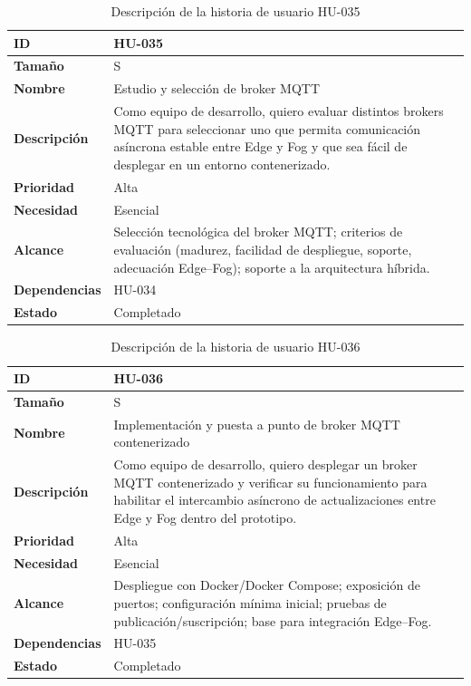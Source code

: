 \documentclass{report}
\begin{document}
\begin{table}[H]
\centering
\caption{Descripción de la historia de usuario HU-035}
\label{tab:hu035}
\begin{tabular}{|l|p{12cm}|}
\hline
\textbf{ID} & HU-035 \\ \hline
\textbf{Tamaño} & S \\ \hline
\textbf{Nombre} & Estudio y selección de broker MQTT \\ \hline
\textbf{Descripción} &
Como equipo de desarrollo, quiero evaluar distintos brokers MQTT para seleccionar uno que permita comunicación asíncrona estable entre Edge y Fog y que sea fácil de desplegar en un entorno contenerizado. \\ \hline
\textbf{Prioridad} & Alta \\ \hline
\textbf{Necesidad} & Esencial \\ \hline
\textbf{Alcance} &
Selección tecnológica del broker MQTT; criterios de evaluación (madurez, facilidad de despliegue, soporte, adecuación Edge--Fog); soporte a la arquitectura híbrida. \\ \hline
\textbf{Dependencias} & HU-034 \\ \hline
\textbf{Estado} & Completado \\ \hline
\end{tabular}
\end{table}



\begin{table}[H]
\centering
\caption{Descripción de la historia de usuario HU-036}
\label{tab:hu036}
\begin{tabular}{|l|p{12cm}|}
\hline
\textbf{ID} & HU-036 \\ \hline
\textbf{Tamaño} & S \\ \hline
\textbf{Nombre} & Implementación y puesta a punto de broker MQTT contenerizado \\ \hline
\textbf{Descripción} &
Como equipo de desarrollo, quiero desplegar un broker MQTT contenerizado y verificar su funcionamiento para habilitar el intercambio asíncrono de actualizaciones entre Edge y Fog dentro del prototipo. \\ \hline
\textbf{Prioridad} & Alta \\ \hline
\textbf{Necesidad} & Esencial \\ \hline
\textbf{Alcance} &
Despliegue con Docker/Docker Compose; exposición de puertos; configuración mínima inicial; pruebas de publicación/suscripción; base para integración Edge--Fog. \\ \hline
\textbf{Dependencias} & HU-035 \\ \hline
\textbf{Estado} & Completado \\ \hline
\end{tabular}
\end{table}
\end{document}
